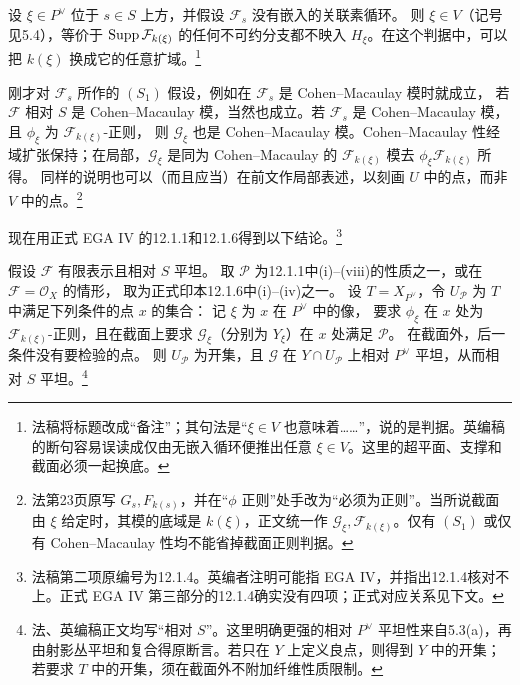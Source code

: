 \begingroup
\def\OO{\mathcal O}\def\FF{\mathcal F}\def\GG{\mathcal G}
\def\PP{\mathbf P}\def\calP{\mathcal P}\def\dd{\delta}
\def\Div{\operatorname{Div}}\def\depth{\operatorname{depth}}
\def\pr{\operatorname{pr}}\def\coker{\operatorname{coker}}
设 $\xi\in P^\vee$ 位于 $s\in S$ 上方，并假设 $\FF_s$ 没有嵌入的关联素循环。
则 $\xi\in V$（记号见5.4），等价于 $\Supp\FF_{k(\xi)}$ 的任何不可约分支都不映入
$H_\xi$。在这个判据中，可以把 $k(\xi)$ 换成它的任意扩域。\footnote{法稿将标题改成“备注”；其句法是“$\xi\in V$ 也意味着……”，说的是判据。英编稿的断句容易误读成仅由无嵌入循环便推出任意 $\xi\in V$。这里的超平面、支撑和截面必须一起换底。}

刚才对 $\FF_s$ 所作的 $(S_1)$ 假设，例如在 $\FF_s$ 是 Cohen--Macaulay 模时就成立，
若 $\FF$ 相对 $S$ 是 Cohen--Macaulay 模，当然也成立。若 $\FF_s$ 是
Cohen--Macaulay 模，且 $\phi_\xi$ 为 $\FF_{k(\xi)}$-正则，
则 $\GG_\xi$ 也是 Cohen--Macaulay 模。Cohen--Macaulay 性经域扩张保持；在局部，$\GG_\xi$ 是同为 Cohen--Macaulay 的
$\FF_{k(\xi)}$ 模去 $\phi_\xi\FF_{k(\xi)}$ 所得。
同样的说明也可以（而且应当）在前文作局部表述，以刻画 $U$ 中的点，而非 $V$ 中的点。\footnote{法第23页原写 $G_s,F_{k(s)}$，并在“$\phi$ 正则”处手改为“必须为正则”。当所说截面由 $\xi$ 给定时，其模的底域是 $k(\xi)$，正文统一作 $\GG_\xi,\FF_{k(\xi)}$。仅有 $(S_1)$ 或仅有 Cohen--Macaulay 性均不能省掉截面正则判据。}

现在用正式 EGA IV 的12.1.1和12.1.6得到以下结论。\footnote{法稿第二项原编号为12.1.4。英编者注明可能指 EGA IV，并指出12.1.4核对不上。正式 EGA IV 第三部分的12.1.4确实没有四项；正式对应关系见下文。}

假设 $\FF$ 有限表示且相对 $S$ 平坦。
取 $\calP$ 为12.1.1中(i)--(viii)的性质之一，或在 $\FF=\OO_X$ 的情形，
取为正式印本12.1.6中(i)--(iv)之一。
设 $T=X_{P^\vee}$，令 $U_{\calP}$ 为 $T$ 中满足下列条件的点 $x$ 的集合：
记 $\xi$ 为 $x$ 在 $P^\vee$ 中的像，
要求 $\phi_\xi$ 在 $x$ 处为 $\FF_{k(\xi)}$-正则，且在截面上要求
$\GG_\xi$（分别为 $Y_\xi$）在 $x$ 处满足 $\calP$。
在截面外，后一条件没有要检验的点。
则 $U_{\calP}$ 为开集，且 $\GG$ 在 $Y\cap U_{\calP}$ 上相对 $P^\vee$ 平坦，从而相对 $S$ 平坦。\footnote{法、英编稿正文均写“相对 $S$”。这里明确更强的相对 $P^\vee$ 平坦性来自5.3(a)，再由射影丛平坦和复合得原断言。若只在 $Y$ 上定义良点，则得到 $Y$ 中的开集；若要求 $T$ 中的开集，须在截面外不附加纤维性质限制。}

